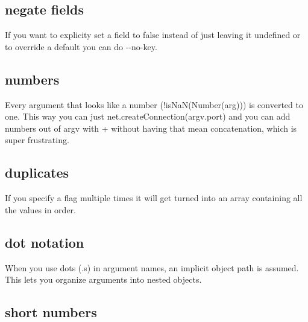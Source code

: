 \subsection*{negate fields }

If you want to explicity set a field to false instead of just leaving it undefined or to override a default you can do {\ttfamily -\/-\/no-\/key}. 


\subsection*{numbers }

Every argument that looks like a number ({\ttfamily !is\+Na\+N(Number(arg))}) is converted to one. This way you can just {\ttfamily net.\+create\+Connection(argv.\+port)} and you can add numbers out of {\ttfamily argv} with {\ttfamily +} without having that mean concatenation, which is super frustrating.

\subsection*{duplicates }

If you specify a flag multiple times it will get turned into an array containing all the values in order. 


\subsection*{dot notation }

When you use dots ({\ttfamily .}s) in argument names, an implicit object path is assumed. This lets you organize arguments into nested objects. 


\subsection*{short numbers }

